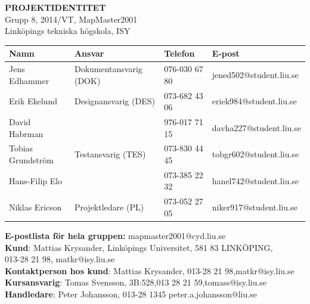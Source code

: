 \documentclass[a4paper,12pt,fleqn]{article}
\begin{document}
	\vspace*{\fill}
		\begingroup
			\begin{center}
				\LARGE{\textbf{PROJEKTIDENTITET}}
				\\
				\footnotesize
				Grupp 8, 2014/VT, MapMaster2001
				\\
				Linköpings tekniska högskola, ISY
				\\
				\vspace{1cm}
	  \begin{tabular}{| p{3cm} | p{4.3cm} | p{2.4cm} | p{3.8cm} |}
	    \hline
		\textbf{Namn} & \textbf{Ansvar} & \textbf{Telefon} & \textbf{E-post} \\ \hline
	    Jens Edhammer & Dokumentansvarig (DOK) & 076-030 67 80 & jened502@student.liu.se \\ \hline
		Erik Ekelund & Designansvarig (DES) & 073-682 43 06 & eriek984@student.liu.se \\ \hline
		David Habrman &  & 976-017 71 15 & davha227@student.liu.se \\ \hline 
		Tobias Grundström & Testansvarig (TES) & 073-830 44 45 & tobgr602@student.liu.se \\ \hline 
		Hans-Filip Elo &   & 073-385 22 32 & hanel742@student.liu.se \\ \hline 
		Niklas Ericson & Projektledare (PL) & 073-052 27 05 & niker917@student.liu.se \\ \hline
	    \end{tabular}
		
		\vspace{1cm}
		\textbf{E-postlista för hela gruppen:} mapmaster2001@cyd.liu.se
		\\[0.5cm]
		
		\textbf{Kund}: Mattias Krysander, Linköpings Universitet, 581 83  LINKÖPING, \\
		013-28 21 98, matkr@isy.liu.se \\
		\textbf{Kontaktperson hos kund}: Mattias Krysander, 013-28 21 98,matkr@isy.liu.se 
		\\
		\textbf{Kursansvarig}: Tomas Svensson, 3B:528,013 28 21 59,tomass@isy.liu.se
		\\[0.5cm]
		\textbf{Handledare}: Peter Johansson, 013-28 1345 peter.a.johansson@liu.se

				\end{center}
		\endgroup
	\vspace*{\fill}
\newpage

\end{document}
